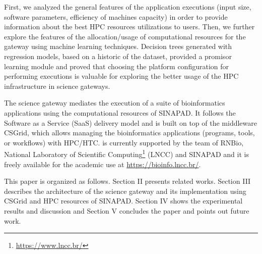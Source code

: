 First, we analyzed the general features of the application executions (input size, software parameters, efficiency of machines capacity) in order to provide information about the best HPC resources utilizations to users. Then, we further explore the features of the allocation/usage of computational resources for the gateway using machine learning techniques. Decision trees generated with regression models, based on a historic of the dataset, provided a promisor learning module and proved that choosing the platform configuration for performing executions is valuable for exploring the better usage of the HPC infrastructure in science gateways.

The science gateway \system mediates the execution of a suite of bioinformatics applications using the computational resources of SINAPAD. It follows the Software as a Service (SaaS) delivery model and is built on top of the middleware CSGrid, which allows managing the bioinformatics applications (programs, tools, or workflows) with HPC/HTC. \system is currently supported by the team of RNBio, National Laboratory of Scientific Computing\footnote{\url{https://www.lncc.br/}} (LNCC) and SINAPAD and it is freely available for the academic use at \url{https://bioinfo.lncc.br/}.

This paper is organized as follows. Section II presents related works. Section III describes the architecture of the science gateway \system and its implementation using CSGrid and HPC resources of SINAPAD. Section IV shows the experimental results and discussion and Section V concludes the paper and points out future work.



